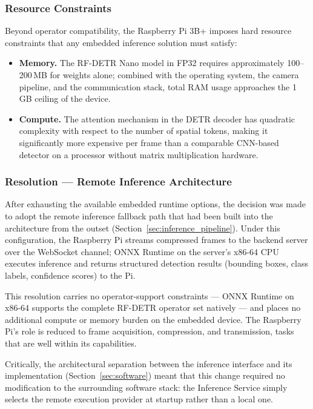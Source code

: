 \subsubsection{Resource Constraints}

Beyond operator compatibility, the Raspberry Pi 3B+ imposes hard
resource constraints that any embedded inference solution must satisfy:

\begin{itemize}
    \item \textbf{Memory.} The RF-DETR Nano model in FP32 requires
          approximately 100--200\,MB for weights alone; combined with
          the operating system, the camera pipeline, and the
          communication stack, total RAM usage approaches the 1\,GB
          ceiling of the device.

    \item \textbf{Compute.} The attention mechanism in the DETR decoder
          has quadratic complexity with respect to the number of
          spatial tokens, making it significantly more expensive per
          frame than a comparable CNN-based detector on a processor
          without matrix multiplication hardware.
\end{itemize}

\subsubsection{Resolution — Remote Inference Architecture}

After exhausting the available embedded runtime options, the decision
was made to adopt the remote inference fallback path that had been
built into the architecture from the outset
(Section~\ref{sec:inference_pipeline}). Under this configuration,
the Raspberry Pi streams compressed frames to the backend server over
the WebSocket channel; ONNX Runtime on the server's x86-64 CPU
executes inference and returns structured detection results
(bounding boxes, class labels, confidence scores) to the Pi.

This resolution carries no operator-support constraints — ONNX Runtime
on x86-64 supports the complete RF-DETR operator set natively —
and places no additional compute or memory burden on the embedded
device. The Raspberry Pi's role is reduced to frame acquisition,
compression, and transmission, tasks that are well within its
capabilities.

Critically, the architectural separation between the inference
interface and its implementation (Section~\ref{sec:software}) meant
that this change required no modification to the surrounding software
stack: the Inference Service simply selects the remote execution
provider at startup rather than a local one.

